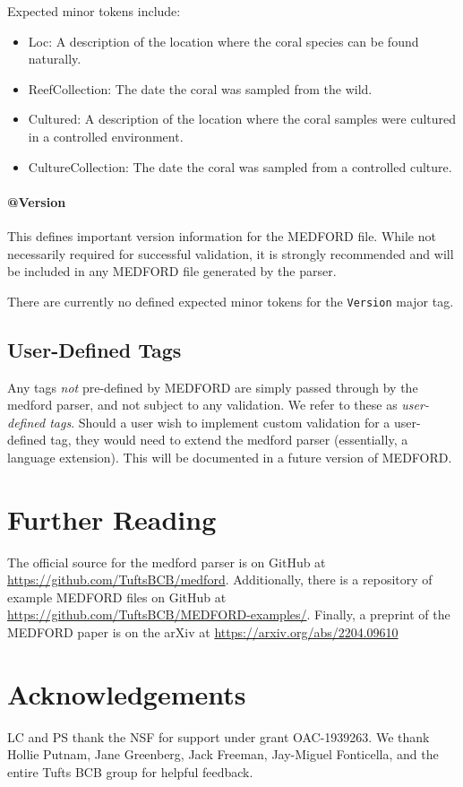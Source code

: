 \documentclass[10pt]{article}
\begin{document}
    Expected minor tokens include:
    \begin{itemize}
        \item Loc: A description of the location where the coral species can be found naturally.
        \item ReefCollection: The date the coral was sampled from the wild.
        \item Cultured: A description of the location where the coral samples were cultured in a controlled environment.
        \item CultureCollection: The date the coral was sampled from a controlled culture.
    \end{itemize}
    
    \paragraph{@Version}
    
    This defines important version information for the MEDFORD file. While not necessarily required for successful validation, it is strongly recommended and will be included in any MEDFORD file generated by the parser.
    
    There are currently no defined expected minor tokens for the \texttt{Version} major tag.
    


\subsection{User-Defined Tags}\label{user-defined}

Any tags \emph{not} pre-defined by MEDFORD are simply passed through by the medford parser, and not subject to any validation. We refer to these as \emph{user-defined tags}. Should a user wish to implement custom validation for a user-defined tag, they would need to extend the medford parser (essentially, a language extension). This will be documented in a future version of MEDFORD.

\section{Further Reading}{
    The official source for the medford parser is on GitHub at \url{https://github.com/TuftsBCB/medford}.
    Additionally, there is a repository of example MEDFORD files on GitHub at \url{https://github.com/TuftsBCB/MEDFORD-examples/}.
    Finally, a preprint of the MEDFORD paper is on the arXiv at \url{https://arxiv.org/abs/2204.09610}
}

\section{Acknowledgements}{LC and PS thank the NSF for support under grant OAC-1939263. We thank Hollie Putnam, Jane Greenberg, Jack Freeman, Jay-Miguel Fonticella, and the entire Tufts BCB group for helpful feedback.}
\end{document}
